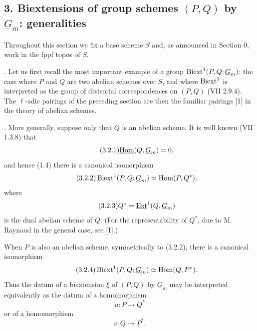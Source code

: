 
\subsection*{3. Biextensions of group schemes $(P,Q)$ by
$\underline G_m$: generalities}

Throughout this section we fix a base scheme $S$ and, as announced in
Section 0, work in the fppf topos of $S$.

\medskip
{}.  Let us first recall the most important example of a
group $\Biext^1(P,Q;\underline G_m)$: the case where $P$ and $Q$ are
two abelian schemes over $S$, and where $\operatorname{Biext}^1$ is interpreted as
the group of divisorial correspondences on $(P,Q)$ (VII 2.9.4).  The
$\ell$-adic pairings of the preceding section are then the familiar
pairings [1] in the theory of abelian schemes.

\medskip
{}.  More generally, suppose only that $Q$ is an abelian
scheme.  It is well known (VII 1.3.8) that
\begin{equation}\tag{3.2.1}
 \uHom(Q,\underline G_m)=0,
\end{equation}
and hence (1.4) there is a canonical isomorphism
\begin{equation}\tag{3.2.2}
 \Biext^1(P,Q;\underline G_m)\simeq\Hom(P,Q^*),
\end{equation}
where
\begin{equation}\tag{3.2.3}
 Q^*=\uExt^1(Q,\underline G_m)
\end{equation}
is the dual abelian scheme of $Q$.  (For the representability of
$Q^*$, due to M. Raynaud in the general case, see [1].)

When $P$ is also an abelian scheme, symmetrically to (3.2.2), there is
a canonical isomorphism
\begin{equation}\tag{3.2.4}
 \Biext^1(P,Q;\underline G_m)\simeq\Hom(Q,P^*).
\end{equation}
Thus the datum of a biextension $\xi$ of $(P,Q)$ by $\underline G_m$
may be interpreted equivalently as the datum of a homomorphism
\[
 u:P\longrightarrow Q^*
\]
or of a homomorphism
\[
 v:Q\longrightarrow P^*.
\]


